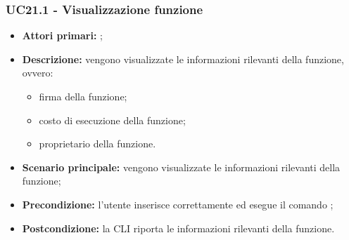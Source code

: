 \subsubsection{UC21.1 - Visualizzazione funzione}
\begin{itemize}
	\item \textbf{Attori primari:} \us{};
	\item \textbf{Descrizione:} vengono visualizzate le informazioni rilevanti della funzione, ovvero:
	\begin{itemize}
		\item firma della funzione;
		\item costo di esecuzione della funzione;
		\item proprietario della funzione. 
	\end{itemize}
	\item \textbf{Scenario principale:} vengono visualizzate le informazioni rilevanti della funzione;
	\item \textbf{Precondizione:} l'utente inserisce correttamente ed esegue il comando \plista{};
	\item \textbf{Postcondizione:} la CLI riporta le informazioni rilevanti della funzione.
\end{itemize}